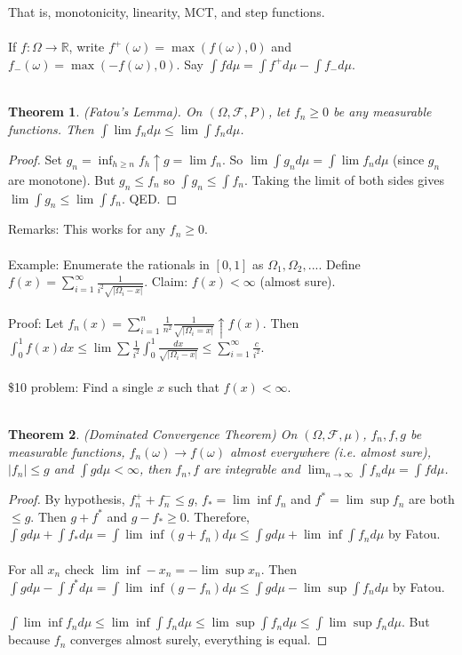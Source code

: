 \documentclass[12pt]{article}
\newtheorem{theorem}{Theorem}
\begin{document}
That is, monotonicity, linearity, MCT, and step functions.
\\ \\
If $f : \Omega \to \mathbb{R}$, write $f^+(\omega) = \max(f(\omega), 0)$ and $f_-(\omega) = \max(-f(\omega), 0)$.  Say $\int f d \mu = \int f^+ d \mu - \int f_- d \mu$.
\\ \\
\begin{theorem}
(Fatou's Lemma).  On $(\Omega, \mathcal{F}, P)$, let $f_n \ge 0$ be any measurable functions.  Then $\int \lim f_n d \mu \le \lim \int f_n d \mu$.
\end{theorem}
\begin{proof}
Set $g_n  = \inf_{h \ge n} f_h \uparrow g = \lim f_n$.  So $\lim \int g_n d \mu = \int \lim f_n d \mu$ (since $g_n$ are monotone).  But $g_n \le f_n$ so $\int g_n \le \int f_n$.  Taking the limit of both sides gives $\lim \int g_n \le \lim \int f_n$.  QED.
\end{proof}
Remarks:  This works for any $f_n \ge 0$.
\\ \\
Example: Enumerate the rationals in $[0,1]$ as $\Omega_1, \Omega_2, ...$.  Define $f(x) = \sum_{i=1}^\infty \frac{1}{i^2 \sqrt{|\Omega_i - x|}}$.  Claim: $f(x) < \infty$ (almost sure).
\\ \\
Proof: Let $f_n(x) = \sum_{i=1}^n \frac{1}{n^2} \frac{1}{\sqrt{|\Omega_i = x|}} \uparrow f(x)$.  Then $\int_0^1 f(x) dx \le \lim \sum \frac{1}{i^2} \int_0^1 \frac{dx}{\sqrt{|\Omega_i - x|} } \le \sum_{i=1}^\infty \frac{c}{i^2}$.
\\ \\
\$10 problem:
Find a single $x$ such that $f(x) < \infty$.
\\ \\
\begin{theorem}
(Dominated Convergence Theorem) On $(\Omega, \mathcal{F}, \mu)$, $f_n, f, g$ be measurable functions, $f_n(\omega) \rightarrow f(\omega)$ almost everywhere (i.e. almost sure), $|f_n| \le g$ and $\int g d \mu < \infty$, then $f_n, f$ are integrable and $\lim_{n \to \infty} \int f_n d \mu = \int f d \mu$.
\end{theorem}
\begin{proof}
By hypothesis, $f_n^+ + f_n^- \le g$, $f_* = \lim \inf f_n$ and $f^* = \lim \sup f_n$ are both $\le g$.  Then $g + f^*$ and $g - f_* \ge 0$.  Therefore, $\int g d \mu + \int f_* d \mu = \int \lim \inf (g + f_n) d \mu \le \int g d  \mu + \lim \inf \int f_n d \mu$ by Fatou.
\\ \\
For all $x_n$ check $\lim \inf -x_n = - \lim \sup x_n$.  Then $\int g d \mu - \int f^* d \mu = \int \lim \inf (g - f_n) d \mu \le \int g d \mu - \lim \sup \int f_n d \mu$ by Fatou.
\\ \\
$\int \lim \inf f_n d \mu \le \lim \inf \int f_n d \mu \le \lim \sup \int f_n d \mu \le \int \lim \sup f_n d \mu$.  But because $f_n$ converges almost surely, everything is equal.
\end{proof}
\end{document}

